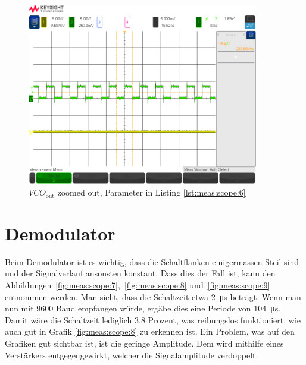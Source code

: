 \begin{figure}[h!tb]
    \centering
    \includegraphics[width=0.9\textwidth, trim=0mm 21mm 0mm 11mm, clip]{images/scopeShots/scope_6b.png}
    \caption{$VCO_{\mathrm{out}}$ zoomed out, Parameter in Listing \ref{lst:meas:scope:6}}
    \label{fig:meas:scope:6}
\end{figure}


\clearpage
\section{Demodulator}
\label{sec:val:demodulator}

Beim  Demodulator  ist  es   wichtig,  dass  die  Schaltflanken  einigermassen
Steil  sind  und   der  Signalverlauf  ansonsten  konstant.    Dass  dies  der
Fall ist,  kann den Abbildungen~\ref{fig:meas:scope:7},~\ref{fig:meas:scope:8}
und~\ref{fig:meas:scope:9} entnommen  werden.  Man sieht, dass  die Schaltzeit
etwa  \SI{2}{\micro\second} betr\"agt. Wenn  man nun  mit 9600  Baud empfangen
w\"urde, erg\"abe dies eine Periode von \SI{104}{\micro\second}.  Damit w\"are
die Schaltzeit lediglich  3.8 Prozent, was reibungslos  funktioniert, wie auch
gut in  Grafik \ref{fig:meas:scope:8} zu  erkennen ist.  Ein Problem,  was auf
den Grafiken  gut sichtbar ist,  ist die geringe Amplitude. Dem  wird mithilfe
eines Verst\"arkers entgegengewirkt, welcher die Signalamplitude verdoppelt.

